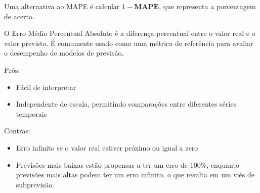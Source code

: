 Uma alternativa ao MAPE é calcular $1 - \textbf{MAPE}$, que representa a porcentagem de acerto.

O Erro Médio Percentual Absoluto é a diferença percentual entre o valor real e o valor previsto. É comumente usado como uma métrica de referência para avaliar o desempenho de modelos de previsão.

Prós:

\begin{itemize}
	\item Fácil de interpretar
	\item Independente de escala, permitindo comparações entre diferentes séries temporais
\end{itemize}

Contras:

\begin{itemize}
	\item Erro infinito se o valor real estiver próximo ou igual a zero
	\item Previsões mais baixas estão propensas a ter um erro de 100\%, enquanto previsões mais altas podem ter um erro infinito, o que resulta em um viés de subprevisão.
\end{itemize}